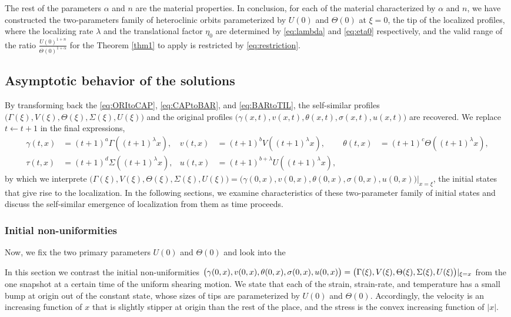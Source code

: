 \documentclass[a4paper,11pt]{article}
\begin{document}
The rest of the parameters $\alpha$ and $n$ are the material properties. In conclusion, for each of the material characterized by $\alpha$ and $n$, we have constructed the two-parameters family of heteroclinic orbits parameterized by $U(0)$ and $\Theta(0)$ at $\xi=0$, the tip of the localized profiles, where the localizing rate $\lambda$ and the translational factor $\eta_0$ are determined by \eqref{eq:lambda} and \eqref{eq:eta0} respectively, and the valid range of the ratio $\frac{U(0)^{1+n}}{\Theta(0)^{1+\alpha}}$ for the Theorem \ref{thm1} to apply is restricted by \eqref{eq:restriction}.


\subsection{Asymptotic behavior of the solutions}
By transforming back the \eqref{eq:ORItoCAP}, \eqref{eq:CAPtoBAR}, and \eqref{eq:BARtoTIL}, the self-similar profiles $\big(\Gamma(\xi),V(\xi),\Theta(\xi),\Sigma(\xi),U(\xi)\big)$ and the original profiles $\big(\gamma(x,t),v(x,t),\theta(x,t),\sigma(x,t),u(x,t)\big)$ are recovered.
We replace $t \leftarrow t+1$ in the final expressions,
\begin{equation*}
\begin{aligned}
 \gamma(t,x) &= (t+1)^a\Gamma((t+1)^\lambda x), & v(t,x) &= (t+1)^b V((t+1)^\lambda x), &\theta(t,x) &= (t+1)^c \Theta((t+1)^\lambda x),\\
 \tau(t,x) &= (t+1)^d \Sigma((t+1)^\lambda x), & u(t,x) &= (t+1)^{b+\lambda} U((t+1)^\lambda x),
\end{aligned}
\end{equation*}
by which we interprete $\big(\Gamma(\xi),V(\xi),\Theta(\xi),\Sigma(\xi),U(\xi)\big)=\big(\gamma(0,x),v(0,x),\theta(0,x),\sigma(0,x),u(0,x)\big)|_{x=\xi}$,  the initial states that give rise to the localization. In the following sections, we examine characteristics of these two-parameter family of initial states and discuss the self-similar emergence of localization from them as time proceeds.

\subsubsection{Initial non-uniformities}

Now, we fix the two primary parameters $U(0)$ and $\Theta(0)$ and look into the 


In this section we contrast the initial non-uniformities $\big(\gamma(0,x),v(0,x),\theta(0,x),\sigma(0,x),u(0,x)\big)=\\ \big(\Gamma(\xi),V(\xi),\Theta(\xi),\Sigma(\xi),U(\xi)\big)|_{\xi=x}$ from the one snapshot at a certain time of the uniform shearing motion. We state that each of the strain, strain-rate, and temperature has a small bump at origin out of the constant state, whose sizes of tips are parameterized by $U(0)$ and $\Theta(0)$. Accordingly, the velocity is an increasing function of $x$ that is slightly stipper at origin than the rest of the place, and the stress is the convex increasing function of $|x|$.  
\end{document}
